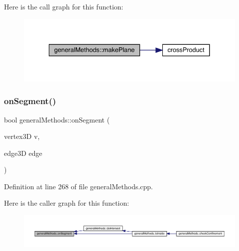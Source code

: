 Here is the call graph for this function\+:
\nopagebreak
\begin{figure}[H]
\begin{center}
\leavevmode
\includegraphics[width=334pt]{namespacegeneral_methods_a06d99f1b292d29dbdbe4734847c8d2ee_cgraph}
\end{center}
\end{figure}
\mbox{\label{namespacegeneral_methods_a557bf2257d6658862b42124035aa9588}} 
\subsubsection{\texorpdfstring{on\+Segment()}{onSegment()}}
{\footnotesize\ttfamily bool general\+Methods\+::on\+Segment (\begin{DoxyParamCaption}\item[{vertex3D}]{v,  }\item[{edge3D}]{edge }\end{DoxyParamCaption})}



Definition at line 268 of file general\+Methods.\+cpp.

Here is the caller graph for this function\+:
\nopagebreak
\begin{figure}[H]
\begin{center}
\leavevmode
\includegraphics[width=350pt]{namespacegeneral_methods_a557bf2257d6658862b42124035aa9588_icgraph}
\end{center}
\end{figure}
\mbox{\label{namespacegeneral_methods_a7bfbfb2a02328d76e70f66fedd57c4ef}} 
